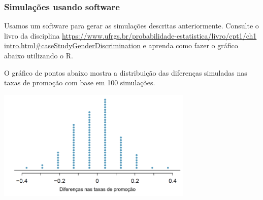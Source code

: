 
\begin{frame}
\frametitle{Simulações usando software}
\justifying
Usamos um software para gerar as simulações descritas anteriormente. Consulte o livro da disciplina 
\href{https://www.ufrgs.br/probabilidade-estatistica/livro/cpt1/ch1_intro.html#caseStudyGenderDiscrimination}{https://www.ufrgs.br/probabilidade-estatistica/livro/cpt1/ch1 intro.html#caseStudyGenderDiscrimination} e aprenda como fazer o gráfico abaixo utilizando o R.

O gráfico de pontos abaixo mostra a distribuição das diferenças simuladas nas taxas de promoção com base em 100 simulações.

\begin{center}
\includegraphics[width=0.7\textwidth]{1-8_gender_discrimination/discRandDotPlot.png}
\end{center}

\end{frame}


